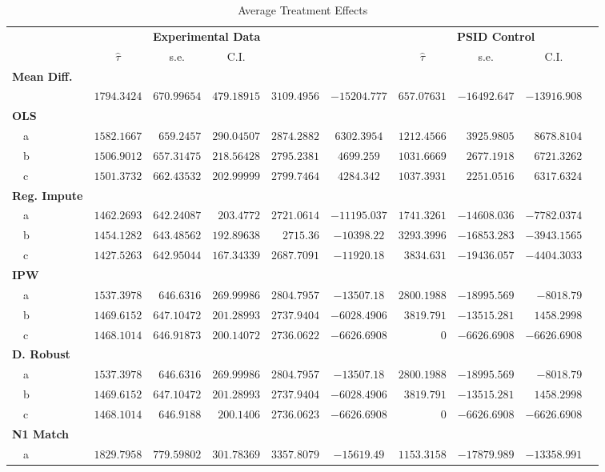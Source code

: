 \documentclass[12pt]{article}
\begin{document}
\begin{landscape}
\begin{table}
 \caption {Average Treatment Effects} \label{tab:title}
\begin{tabular}{lrrrrcrrrr}
\hline\hline
\multicolumn{1}{l}{\bfseries }&\multicolumn{4}{c}{\bfseries Experimental Data}&\multicolumn{1}{c}{\bfseries }&\multicolumn{4}{c}{\bfseries PSID Control}\tabularnewline
\cline{2-5} \cline{7-10}
\multicolumn{1}{l}{}&\multicolumn{1}{c}{$\hat{\tau}$}&\multicolumn{1}{c}{s.e.}&\multicolumn{1}{c}{C.I.}&\multicolumn{1}{c}{}&\multicolumn{1}{c}{}&\multicolumn{1}{c}{$\hat{\tau}$}&\multicolumn{1}{c}{s.e.}&\multicolumn{1}{c}{C.I.}&\multicolumn{1}{c}{}\tabularnewline
\hline
{\bfseries Mean Diff.}&&&&&&&&&\tabularnewline
 ~~&$1794.3424$&$670.99654$&$479.18915$&$3109.4956$&$  -15204.777$&$ 657.07631$&$-16492.647$&$-13916.908 $\tabularnewline
 \hline
 {\bfseries OLS}&&&&&&&&&\tabularnewline
 ~~a&$1582.1667$&$ 659.2457$&$290.04507$&$2874.2882$&$  6302.3954$&$ 1212.4566$&$ 3925.9805$&$ 8678.8104$  \tabularnewline
 ~~b&$1506.9012$&$657.31475$&$218.56428$&$2795.2381$&$  4699.259$&$ 1031.6669$&$ 2677.1918$&$ 6721.3262$  \tabularnewline
 ~~c&$1501.3732$&$662.43532$&$202.99999$&$2799.7464 $&$ 4284.342$&$ 1037.3931$&$ 2251.0516$&$ 6317.6324$  \tabularnewline
 \hline
 {\bfseries Reg. Impute}&&&&&&&&&\tabularnewline
 ~~a&$1462.2693$&$642.24087$&$ 203.4772$&$2721.0614$&$  -11195.037$&$ 1741.3261$&$-14608.036$&$-7782.0374$  \tabularnewline
 ~~b&$1454.1282$&$643.48562$&$192.89638$&$2715.36$&$ -10398.22$&$ 3293.3996$&$-16853.283$&$-3943.1565$  \tabularnewline
 ~~c&$1427.5263$&$642.95044$&$167.34339$&$2687.7091$&$-11920.18$&$3834.631$&$-19436.057$&$-4404.3033$  \tabularnewline
 \hline
 {\bfseries IPW}&&&&&&&&&\tabularnewline
 ~~a&$1537.3978$&$ 646.6316$&$269.99986$&$2804.7957$&$-13507.18$&$ 2800.1988$&$-18995.569$&$-8018.79$  \tabularnewline
 ~~b&$1469.6152$&$647.10472$&$201.28993$&$2737.9404$&$-6028.4906$&$3819.791$&$-13515.281$&$ 1458.2998$  \tabularnewline
~~c&$1468.1014$&$646.91873$&$200.14072$&$2736.0622$&$-6626.6908$&$ 0$&$-6626.6908$&$-6626.6908$  \tabularnewline
\hline
{\bfseries D. Robust}&&&&&&&&&\tabularnewline
~~a&$1537.3978$&$ 646.6316$&$269.99986$&$2804.7957$&$-13507.18$&$ 2800.1988$&$-18995.569$&$-8018.79$  \tabularnewline
~~b&$1469.6152$&$647.10472$&$201.28993$&$2737.9404$&$-6028.4906$&$3819.791$&$-13515.281$&$ 1458.2998$  \tabularnewline
~~c&$1468.1014$&$ 646.9188$&$ 200.1406$&$2736.0623$&$-6626.6908$&$ 0$&$-6626.6908$&$-6626.6908$  \tabularnewline
\hline
{\bfseries N1 Match}&&&&&&&&&\tabularnewline
~~a&$1829.7958$&$779.59802$&$301.78369$&$3357.8079$&$-15619.49$&$ 1153.3158$&$-17879.989$&$-13358.991$  \tabularnewline

\end{tabular}
\end{table}
\end{landscape}
\end{document}
